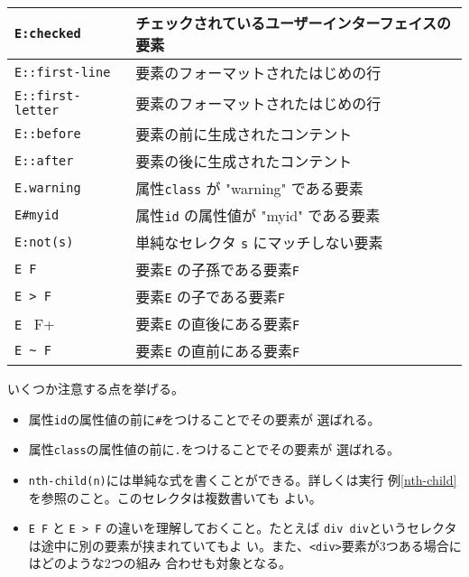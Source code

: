 \begin{longtable}{|m{13em}|m{}|}
\Verb+E:checked+&チェックされているユーザーインターフェイスの要素%
\\\hline
\Verb+E::first-line+&要素のフォーマットされたはじめの行%
\\\hline
\Verb+E::first-letter+&要素のフォーマットされたはじめの行%
\\\hline
\Verb+E::before+&要素の前に生成されたコンテント%
\\\hline
\Verb+E::after+&要素の後に生成されたコンテント%
\\\hline
\Verb+E.warning+&属性\texttt{class} が "warning" である要素%
\\\hline
\Verb+E#myid+&属性\texttt{id} の属性値が "myid" である要素%
\\\hline
\Verb+E:not(s)+&単純なセレクタ \texttt{s} にマッチしない要素%
\\\hline
\Verb+E F+&要素\texttt{E} の子孫である要素\texttt{F}%
\\\hline
\Verb+E > F+&要素\texttt{E} の子である要素\texttt{F}%
\\\hline
\Verb+E + F+&要素\texttt{E} の直後にある要素\texttt{F}%
\\\hline
\Verb+E ~ F+&要素\texttt{E} の直前にある要素\texttt{F}%
\\\hline
\end{longtable}

いくつか注意する点を挙げる。
\begin{itemize}
 \item 属性\texttt{id}の属性値の前に\texttt{\#}をつけることでその要素が
       選ばれる。
 \item 属性\texttt{class}の属性値の前に\texttt{.}をつけることでその要素が
       選ばれる。
 \item \texttt{nth-child(n)}には単純な式を書くことができる。詳しくは実行
       例\ref{nth-child}を参照のこと。このセレクタは複数書いても
       よい。
 \item \Verb+E F+ と \Verb+E > F+ の違いを理解しておくこと。たとえば
       \texttt{div div}というセレクタは途中に別の要素が挟まれていてもよ
       い。また、\texttt{<div>}要素が3つある場合にはどのような2つの組み
       合わせも対象となる。
\end{itemize}


